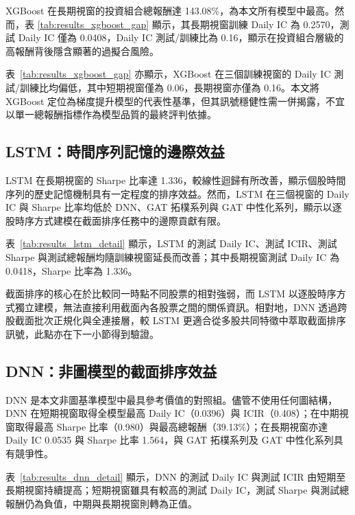 XGBoost 在長期視窗的投資組合總報酬達 143.08\%，為本文所有模型中最高。然而，表 \ref{tab:results_xgboost_gap} 顯示，其長期視窗訓練 Daily IC 為 0.2570，測試 Daily IC 僅為 0.0408，Daily IC 測試/訓練比為 0.16，顯示在投資組合層級的高報酬背後隱含顯著的過擬合風險。



表~\ref{tab:results_xgboost_gap} 亦顯示，XGBoost 在三個訓練視窗的 Daily IC 測試/訓練比均偏低，其中短期視窗僅為 0.06，長期視窗亦僅為 0.16。本文將 XGBoost 定位為梯度提升模型的代表性基準，但其訊號穩健性需一併揭露，不宜以單一總報酬指標作為模型品質的最終評判依據。

\subsection{LSTM：時間序列記憶的邊際效益}
\label{subsec:lstm_results}

LSTM 在長期視窗的 Sharpe 比率達 1.336，較線性迴歸有所改善，顯示個股時間序列的歷史記憶機制具有一定程度的排序效益。然而，LSTM 在三個視窗的 Daily IC 與 Sharpe 比率均低於 DNN、GAT 拓樸系列與 GAT 中性化系列，顯示以逐股時序方式建模在截面排序任務中的邊際貢獻有限。



表~\ref{tab:results_lstm_detail} 顯示，LSTM 的測試 Daily IC、測試 ICIR、測試 Sharpe 與測試總報酬均隨訓練視窗延長而改善；其中長期視窗測試 Daily IC 為 0.0418，Sharpe 比率為 1.336。

截面排序的核心在於比較同一時點不同股票的相對強弱，而 LSTM 以逐股時序方式獨立建模，無法直接利用截面內各股票之間的關係資訊。相對地，DNN 透過跨股截面批次正規化與全連接層，較 LSTM 更適合從多股共同特徵中萃取截面排序訊號，此點亦在下一小節得到驗證。

\subsection{DNN：非圖模型的截面排序效益}
\label{subsec:dnn_results}

DNN 是本文非圖基準模型中最具參考價值的對照組。儘管不使用任何圖結構，DNN 在短期視窗取得全模型最高 Daily IC（0.0396）與 ICIR（0.408）；在中期視窗取得最高 Sharpe 比率（0.980）與最高總報酬（39.13\%）；在長期視窗亦達 Daily IC 0.0535 與 Sharpe 比率 1.564，與 GAT 拓樸系列及 GAT 中性化系列具有競爭性。



表~\ref{tab:results_dnn_detail} 顯示，DNN 的測試 Daily IC 與測試 ICIR 由短期至長期視窗持續提高；短期視窗雖具有較高的測試 Daily IC，測試 Sharpe 與測試總報酬仍為負值，中期與長期視窗則轉為正值。

